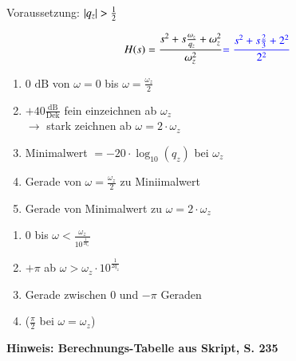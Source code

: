 \begin{minipage}[t]{0.48\columnwidth}
    \raggedright
    \begin{center}
        Voraussetzung: $\left|q_z\right| > \frac{1}{2}$
    \end{center}
    $$ H(s) = \frac{s^2 + s \frac{\omega_z}{q_z} + \omega_z^2}{\omega_z^2} {\color{blue}= \frac{s^2 + s \frac{2}{3} + 2^2}{2^2}} $$

    
\end{minipage}
\hfill
\begin{minipage}[t]{0.48\columnwidth}
        \begin{enumerate}
            \item 0 $\text{dB}$ von $\omega=0$ bis $\omega=\frac{\omega_z}{2}$
            \item $+40\frac{\text{dB}}{\text{Dek}}$ fein einzeichnen ab $\omega_z$\\
            $\rightarrow$ stark zeichnen ab $\omega = 2 \cdot \omega_z$
            \item Minimalwert $= -20\cdot \log_{10}(q_z)$ bei $\omega_z$
            \item Gerade von $\omega=\frac{\omega_z}{2}$ zu Miniimalwert 
            \item Gerade von Minimalwert zu $\omega = 2 \cdot \omega_z$
        \end{enumerate}
        \begin{enumerate}
            \item 0 bis $\omega < \frac{\omega_z}{10^{\frac{1}{2 q_z}}}$
            \item $+ \pi$ ab $\omega > \omega_z \cdot 10^{\frac{1}{2 q_z}}$
            \item Gerade zwischen $0$ und $- \pi$ Geraden
            \item ($\frac{\pi}{2}$ bei $\omega = \omega_z$)
        \end{enumerate}
\end{minipage}

\textbf{Hinweis: Berechnungs-Tabelle aus Skript, S. 235} 

\begingroup
\renewcommand{\arraystretch}{2}
\setlength{\tabcolsep}{0mm}
\endgroup
\renewcommand{\arraystretch}{1}

